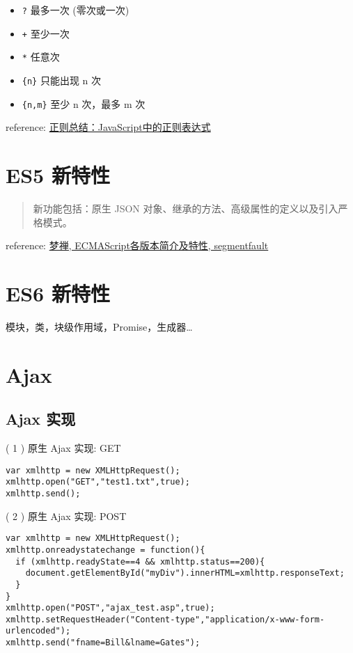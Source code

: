 \begin{itemize}
\item \texttt{?} 最多一次 (零次或一次)
\item \texttt{+} 至少一次
\item \texttt{*} 任意次
\item \texttt{\{n\}} 只能出现 n 次
\item \texttt{\{n,m\}} 至少 n 次，最多 m 次
\end{itemize}

reference: \href{http://www.nowamagic.net/librarys/veda/detail/1283}{正则总结：JavaScript中的正则表达式}

\section{ES5 新特性}\hypertarget{es5-}{}\label{es5-}

\begin{quote}
新功能包括：原生 JSON 对象、继承的方法、高级属性的定义以及引入严格模式。
\end{quote}

reference: \href{http://segmentfault.com/a/1190000003493604}{梦禅, ECMAScript各版本简介及特性, segmentfault}

\section{ES6 新特性}\hypertarget{es6-}{}\label{es6-}

模块，类，块级作用域，Promise，生成器\ldots{}

\section{Ajax}\hypertarget{ajax}{}\label{ajax}

\subsection{Ajax 实现}\hypertarget{ajax-}{}\label{ajax-}

( 1 ) 原生 Ajax 实现: GET

\begin{verbatim}var xmlhttp = new XMLHttpRequest();
xmlhttp.open("GET","test1.txt",true);
xmlhttp.send();
\end{verbatim}

( 2 ) 原生 Ajax 实现: POST

\begin{verbatim}var xmlhttp = new XMLHttpRequest();
xmlhttp.onreadystatechange = function(){
  if (xmlhttp.readyState==4 && xmlhttp.status==200){
    document.getElementById("myDiv").innerHTML=xmlhttp.responseText;
  }
}
xmlhttp.open("POST","ajax_test.asp",true);
xmlhttp.setRequestHeader("Content-type","application/x-www-form-urlencoded");
xmlhttp.send("fname=Bill&lname=Gates");
\end{verbatim}

